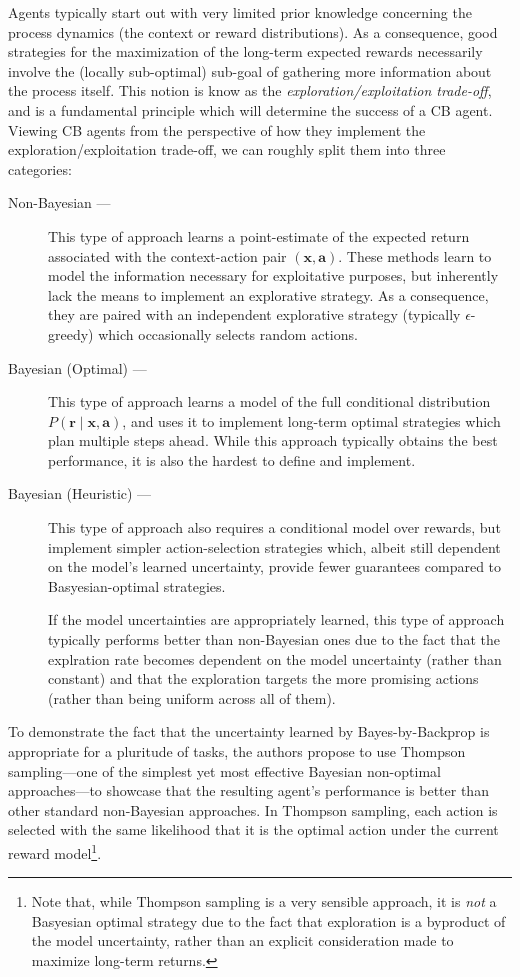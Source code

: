 \documentclass[11pt]{article}
\begin{document}
Agents typically start out with very limited prior knowledge concerning the
process dynamics (the context or reward distributions).  As a consequence, good
strategies for the maximization of the long-term expected rewards necessarily
involve the (locally sub-optimal) sub-goal of gathering more information about
the process itself.  This notion is know as the \emph{exploration/exploitation
trade-off}, and is a fundamental principle which will determine the success of
a CB agent.  Viewing CB agents from the perspective of how they implement the
exploration/exploitation trade-off, we can roughly split them into three
categories:
%
\begin{description}
  \item[Non-Bayesian ---]  This type of approach learns a point-estimate of the
    expected return associated with the context-action pair $(\bm x, \bm a)$.
    These methods learn to model the information necessary for exploitative
    purposes, but inherently lack the means to implement an explorative
    strategy.  As a consequence, they are paired with an independent
    explorative strategy (typically $\epsilon$-greedy) which occasionally
    selects random actions.
  \item[Bayesian (Optimal) ---]  This type of approach learns a model of the
    full conditional distribution $P(\bm r\mid \bm x, \bm a)$, and uses it to
    implement long-term optimal strategies which plan multiple steps ahead.
    While this approach typically obtains the best performance, it is also the
    hardest to define and implement.
  \item[Bayesian (Heuristic) ---]  This type of approach also requires
    a conditional model over rewards, but implement simpler action-selection
    strategies which, albeit still dependent on the model's learned uncertainty,
    provide fewer guarantees compared to Basyesian-optimal strategies.  

    If the model uncertainties are appropriately learned, this type of
    approach typically performs better than non-Bayesian ones due to the fact that
    the explration rate becomes dependent on the model uncertainty (rather than
    constant) and that the exploration targets the more promising actions (rather
    than being uniform across all of them).
\end{description}

To demonstrate the fact that the uncertainty learned by Bayes-by-Backprop is
appropriate for a pluritude of tasks, the authors propose to use Thompson
sampling---one of the simplest yet most effective Bayesian non-optimal
approaches---to showcase that the resulting agent's performance is better than
other standard non-Bayesian approaches.  In Thompson sampling, each action is
selected with the same likelihood that it is the optimal action under the
current reward model\footnote{Note that, while Thompson sampling is a very
sensible approach, it is \emph{not} a Basyesian optimal strategy due to the
fact that exploration is a byproduct of the model uncertainty, rather than an
explicit consideration made to maximize long-term returns.}.  
\end{document}
